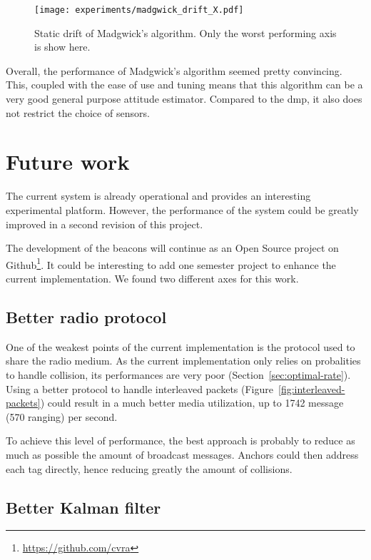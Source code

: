 \documentclass[a4paper, 12pt]{scrreprt}
\begin{document}
\begin{figure}[h]
    \centering
    \texttt{[image: experiments/madgwick\_drift\_X.pdf]}
    \caption{Static drift of Madgwick's algorithm.
    Only the worst performing axis is show here.}
    \label{fig:madgwick-drift}
\end{figure}

Overall, the performance of Madgwick's algorithm seemed pretty convincing.
This, coupled with the ease of use and tuning means that this algorithm can be a very good general purpose attitude estimator.
Compared to the \gls{dmp}, it also does not restrict the choice of sensors.

\chapter{Future work}

The current system is already operational and provides an interesting experimental platform.
However, the performance of the system could be greatly improved in a second revision of this project.

The development of the beacons will continue as an Open Source project on Github\footnote{\url{https://github.com/cvra}}.
It could be interesting to add one semester project to enhance the current implementation.
We found two different axes for this work.

\section{Better radio protocol}

One of the weakest points of the current implementation is the protocol used to share the radio medium.
As the current implementation only relies on probalities to handle collision, its performances are very poor (Section~\ref{sec:optimal-rate}).
Using a better protocol to handle interleaved packets (Figure~\ref{fig:interleaved-packets}) could result in a much better media utilization, up to 1742 message (570 ranging) per second\cite{dw1000manual}.

To achieve this level of performance, the best approach is probably to reduce as much as possible the amount of broadcast messages.
Anchors could then address each tag directly, hence reducing greatly the amount of collisions.


\section{Better Kalman filter}
\end{document}
